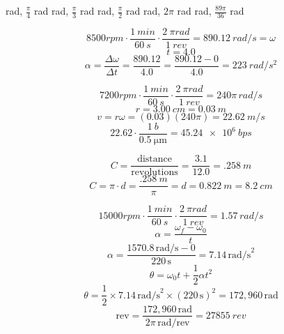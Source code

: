 \documentclass[11pt]{homework}
\begin{document}
\maketitle

\renewcommand{\questiontype}{Problem}
\setcounter{questionCounter}{0}

\question
\begin{alphaparts}
 rad, $\frac{\pi}{4}$ rad
 rad, $\frac{\pi}{3}$ rad
 rad, $\frac{\pi}{2}$ rad
 rad, $2\pi$ rad
 rad, $\frac{89\pi}{36}$ rad
\end{alphaparts}


\setcounter{questionCounter}{3}
\question
\[
    8500 \unit{rpm} \cdot \frac{\qty{1}{min}}{\qty{60}{s}} \cdot \frac{\qty{2}{\pi rad}}{\qty{1}{rev}} = \qty{890.12}{rad /s} = \omega
\]
\[
t = 4.0
\]
\[
    \alpha = \frac{\Delta\omega}{\Delta t}=\frac{890.12}{4.0}=\frac{890.12-0}{4.0} = \boxed{\qty{223}{rad /s^2}}
\]

\question
\begin{alphaparts}
\questionpart
\[
    7200 \unit{rpm} \cdot \frac{\qty{1}{min}}{\qty{60}{s}} \cdot \frac{\qty{2}{\pi rad}}{\qty{1}{rev}} = \boxed{240\pi\, \unit{rad /s}}
\]
\questionpart
\[
r = \qty{3.00}{cm} = \qty{0.03}{m}
\]
\[
    v= r \omega = (0.03)(240\pi) = \boxed{\qty{22.62}{m /s}}
\]
\questionpart
\[
    22.62 \cdot \frac{\qty{1}{b}}{\qty{0.5}{\micro\meter}}= \boxed{\qty{45.24e6}{bps}}
\]



\end{alphaparts}


\question
\[
    C=\frac{\text{distance}}{\text{revolutions}}=\frac{3.1}{12.0}=\qty{.258}{m}
\]
\[
C =\pi \cdot d = \frac{\qty{.258}{m}}{\pi}=d=\qty{0.822}{m}=\boxed{\qty{8.2}{cm}}
\]



\setcounter{questionCounter}{18}
\question
\[
    15000 \unit{rpm} \cdot \frac{\qty{1}{min}}{\qty{60}{s}} \cdot \frac{\qty{2}{\pi rad}}{\qty{1}{rev}} = 1.57\, \unit{rad /s}
\]
\[
\alpha = \frac{\omega_f - \omega_0}{t}
\]
\[
\alpha = \frac{1570.8 \, \text{rad/s} - 0}{220 \, \text{s}} = 7.14 \, \text{rad/s}^2
\]
\[
\theta = \omega_0 t + \frac{1}{2} \alpha t^2
\]
\[
\theta = \frac{1}{2} \times 7.14 \, \text{rad/s}^2 \times (220 \, \text{s})^2= 172,960 \, \text{rad}
\]
\[
\text{rev} = \frac{172,960 \, \text{rad}}{2\pi \, \text{rad/rev}} = \boxed{\qty{27855}{rev}}
\]
\end{document}
